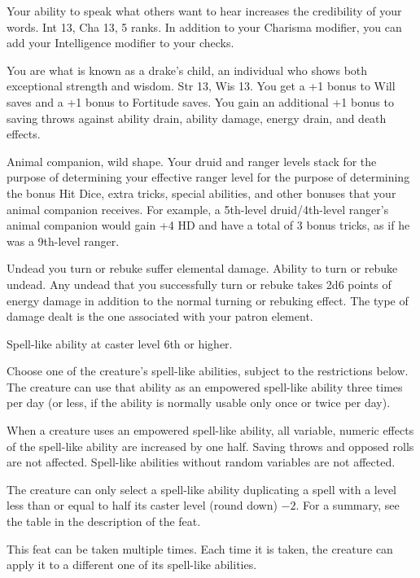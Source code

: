 {Your ability to speak what others want to hear increases the credibility of your words.}
{Int 13, Cha 13,  5 ranks.}
{In addition to your Charisma modifier, you can add your Intelligence modifier to your  checks.}
{}{}

{You are what is known as a drake's child, an individual who shows both exceptional strength and wisdom.}
{Str 13, Wis 13.}
{You get a +1 bonus to Will saves and a +1 bonus to Fortitude saves. You gain an additional +1 bonus to saving throws against ability drain, ability damage, energy drain, and death effects.}
{}{}

{Animal companion, wild shape.}
{
Your druid and ranger levels stack for the purpose of determining your effective ranger level for the purpose of determining the bonus Hit Dice, extra tricks, special abilities, and other bonuses that your animal companion receives. For example, a 5th-level druid/4th-level ranger's animal companion would gain +4 HD and have a total of 3 bonus tricks, as if he was a 9th-level ranger.
}


{Undead you turn or rebuke suffer elemental damage.}
{Ability to turn or rebuke undead.}
{Any undead that you successfully turn or rebuke takes 2d6 points of energy damage in addition to the normal turning or rebuking effect. The type of damage dealt is the one associated with your patron element.}
{}{}

{}
{Spell-like ability at caster level 6th or higher.}
{Choose one of the creature's spell-like abilities, subject to the restrictions below. The creature can use that ability as an empowered spell-like ability three times per day (or less, if the ability is normally usable only once or twice per day).

When a creature uses an empowered spell-like ability, all variable, numeric effects of the spell-like ability are increased by one half. Saving throws and opposed rolls are not affected. Spell-like abilities without random variables are not affected.

The creature can only select a spell-like ability duplicating a spell with a level less than or equal to half its caster level (round down) $-2$. For a summary, see the table in the description of the  feat.}
{}
{This feat can be taken multiple times. Each time it is taken, the creature can apply it to a different one of its spell-like abilities.}


